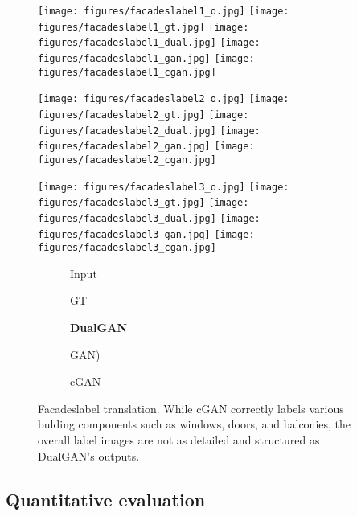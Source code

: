 \begin{figure}
\begin{center}
\texttt{[image: figures/facadeslabel1\_o.jpg]}
\texttt{[image: figures/facadeslabel1\_gt.jpg]}
\texttt{[image: figures/facadeslabel1\_dual.jpg]}
\texttt{[image: figures/facadeslabel1\_gan.jpg]}
\texttt{[image: figures/facadeslabel1\_cgan.jpg]}

\texttt{[image: figures/facadeslabel2\_o.jpg]}
\texttt{[image: figures/facadeslabel2\_gt.jpg]}
\texttt{[image: figures/facadeslabel2\_dual.jpg]}
\texttt{[image: figures/facadeslabel2\_gan.jpg]}
\texttt{[image: figures/facadeslabel2\_cgan.jpg]}

\texttt{[image: figures/facadeslabel3\_o.jpg]}
\texttt{[image: figures/facadeslabel3\_gt.jpg]}
\texttt{[image: figures/facadeslabel3\_dual.jpg]}
\texttt{[image: figures/facadeslabel3\_gan.jpg]}
\texttt{[image: figures/facadeslabel3\_cgan.jpg]}



\begin{subfigure}[]{0.19\linewidth}\caption*{Input}\end{subfigure}
\begin{subfigure}[]{0.19\linewidth}\caption*{GT}\end{subfigure}
\begin{subfigure}[]{0.19\linewidth}\caption*{\textbf{DualGAN}}\end{subfigure}
\begin{subfigure}[]{0.19\linewidth}\caption*{GAN)}\end{subfigure}
\begin{subfigure}[]{0.19\linewidth}\caption*{cGAN~\cite{isola2016image}}\end{subfigure}
\caption{Facadeslabel translation. While cGAN correctly labels various 
bulding components such as windows, doors, and balconies, the overall label images 
are not as detailed and structured as DualGAN's outputs.} 
\label{fig:facades2label}
\end{center}
\end{figure}

\subsection{Quantitative evaluation}

